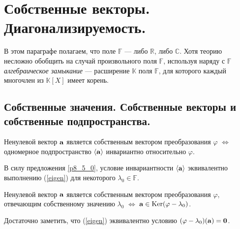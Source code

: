 \section{Собственные векторы. Диагонализируемость.}

В этом параграфе полагаем, что поле $\mathbb{F}$ --- либо $\mathbb{R}$, либо $\mathbb{C}$.
{\footnotesize Хотя теорию несложно обобщить на случай произвольного поля $\mathbb{F}$, используя
наряду с $\mathbb{F}$ {\it алгебраическое замыкание}  --- расширение
$\mathbb{K}$ поля $\mathbb{F}$, для которого каждый многочлен из $\mathbb{K}[X]$ имеет корень.}


\subsection{Собственные значения. Собственные векторы и собственные подпространства.}





\begin{predl}\label{p8_5_6}
Ненулевой вектор $\mathbf{a}$ является собственным вектором преобразования $\varphi$
$\Leftrightarrow$
одномерное подпространство
$\langle \mathbf{a} \rangle$ инвариантно относительно $\varphi$.
\end{predl}
\dok  В силу предложения \ref{p8_5_0}, условие 
инвариантности $\langle \mathbf{a} \rangle$ эквивалентно выполнению (\ref{eigen})
для некоторого $\lambda_0 \in \mathbb{F}$.
\edok


\begin{predl}\label{p8_5_7}
Ненулевой вектор $\mathbf{a}$ является собственным вектором преобразования $\varphi$,
отвечающим собственному значению $\lambda_0$
$\Leftrightarrow$
$\mathbf{a} \in \mathop{\rm Ker}\nolimits (\varphi -\lambda_0)$.
\end{predl}
\dok  Достаточно заметить, что (\ref{eigen}) эквивалентно условию $(\varphi - \lambda _0)(\mathbf{a})=\mathbf{0}$.
\edok

